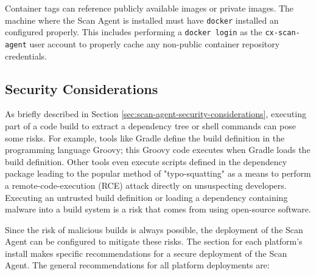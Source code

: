 Container tags can reference publicly available images or private images.  The machine
where the Scan Agent is installed must have \texttt{docker} installed an configured
properly.  This includes performing a \texttt{docker login} as the \texttt{cx-scan-agent} user
account to properly cache any non-public container repository credentials.



\subsection{Security Considerations}\label{sec:scan-agent-security}

As briefly described in Section \ref{sec:scan-agent-security-considerations}, executing
part of a code build to extract a dependency tree or shell commands can pose some risks. For example,
tools like Gradle define the build definition in the programming language Groovy; this Groovy
code executes when Gradle loads the build definition.  Other tools even execute scripts defined
in the dependency package leading to the popular method of "typo-squatting" as a means to
perform a remote-code-execution (RCE) attack directly on unsuspecting developers.  Executing an
untrusted build definition or loading a dependency containing malware into a build system is
a risk that comes from using open-source software.

Since the risk of malicious builds is always possible, the deployment of the Scan Agent
can be configured to mitigate these risks.  The section for each platform's install makes specific
recommendations for a secure deployment of the Scan Agent.  The general recommendations
for all platform deployments are:

